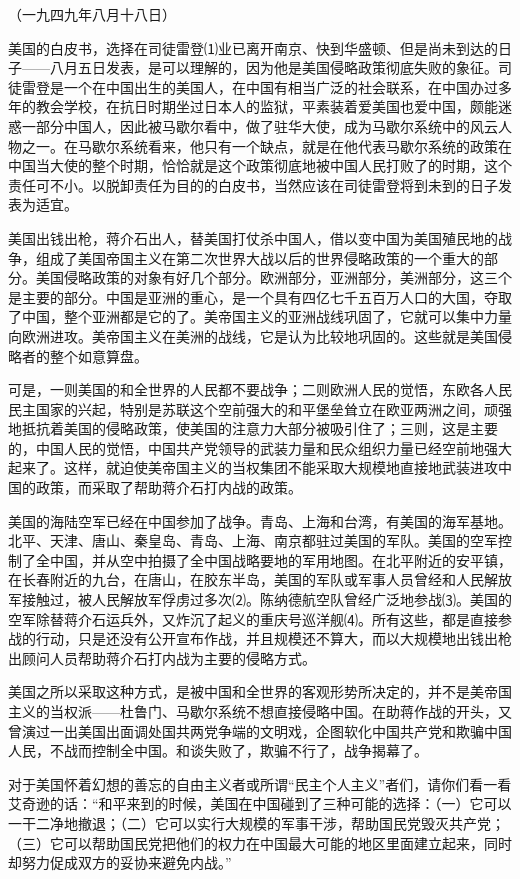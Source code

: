 \documentclass[UTF-8, a5paper, 12pt]{ctexart}
\begin{document}
（一九四九年八月十八日）

美国的白皮书，选择在司徒雷登⑴业已离开南京、快到华盛顿、但是尚未到达的日子——八月五日发表，是可以理解的，因为他是美国侵略政策彻底失败的象征。司徒雷登是一个在中国出生的美国人，在中国有相当广泛的社会联系，在中国办过多年的教会学校，在抗日时期坐过日本人的监狱，平素装着爱美国也爱中国，颇能迷惑一部分中国人，因此被马歇尔看中，做了驻华大使，成为马歇尔系统中的风云人物之一。在马歇尔系统看来，他只有一个缺点，就是在他代表马歇尔系统的政策在中国当大使的整个时期，恰恰就是这个政策彻底地被中国人民打败了的时期，这个责任可不小。以脱卸责任为目的的白皮书，当然应该在司徒雷登将到未到的日子发表为适宜。

美国出钱出枪，蒋介石出人，替美国打仗杀中国人，借以变中国为美国殖民地的战争，组成了美国帝国主义在第二次世界大战以后的世界侵略政策的一个重大的部分。美国侵略政策的对象有好几个部分。欧洲部分，亚洲部分，美洲部分，这三个是主要的部分。中国是亚洲的重心，是一个具有四亿七千五百万人口的大国，夺取了中国，整个亚洲都是它的了。美帝国主义的亚洲战线巩固了，它就可以集中力量向欧洲进攻。美帝国主义在美洲的战线，它是认为比较地巩固的。这些就是美国侵略者的整个如意算盘。

可是，一则美国的和全世界的人民都不要战争；二则欧洲人民的觉悟，东欧各人民民主国家的兴起，特别是苏联这个空前强大的和平堡垒耸立在欧亚两洲之间，顽强地抵抗着美国的侵略政策，使美国的注意力大部分被吸引住了；三则，这是主要的，中国人民的觉悟，中国共产党领导的武装力量和民众组织力量已经空前地强大起来了。这样，就迫使美帝国主义的当权集团不能采取大规模地直接地武装进攻中国的政策，而采取了帮助蒋介石打内战的政策。

美国的海陆空军已经在中国参加了战争。青岛、上海和台湾，有美国的海军基地。北平、天津、唐山、秦皇岛、青岛、上海、南京都驻过美国的军队。美国的空军控制了全中国，并从空中拍摄了全中国战略要地的军用地图。在北平附近的安平镇，在长春附近的九台，在唐山，在胶东半岛，美国的军队或军事人员曾经和人民解放军接触过，被人民解放军俘虏过多次⑵。陈纳德航空队曾经广泛地参战⑶。美国的空军除替蒋介石运兵外，又炸沉了起义的重庆号巡洋舰⑷。所有这些，都是直接参战的行动，只是还没有公开宣布作战，并且规模还不算大，而以大规模地出钱出枪出顾问人员帮助蒋介石打内战为主要的侵略方式。

美国之所以采取这种方式，是被中国和全世界的客观形势所决定的，并不是美帝国主义的当权派——杜鲁门、马歇尔系统不想直接侵略中国。在助蒋作战的开头，又曾演过一出美国出面调处国共两党争端的文明戏，企图软化中国共产党和欺骗中国人民，不战而控制全中国。和谈失败了，欺骗不行了，战争揭幕了。

对于美国怀着幻想的善忘的自由主义者或所谓“民主个人主义”者们，请你们看一看艾奇逊的话：“和平来到的时候，美国在中国碰到了三种可能的选择：（一）它可以一干二净地撤退；（二）它可以实行大规模的军事干涉，帮助国民党毁灭共产党；（三）它可以帮助国民党把他们的权力在中国最大可能的地区里面建立起来，同时却努力促成双方的妥协来避免内战。”
\end{document}
